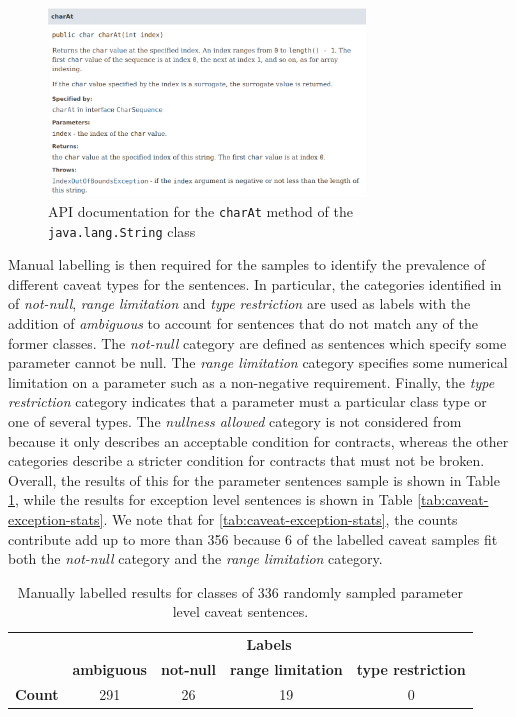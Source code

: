 \begin{figure}
	\label{fig:api-doc-charAt}
	\centering
	\includegraphics[width=0.75\textwidth]{figs/api-doc-charAt.png}
	\caption{API documentation for the \lstinline{charAt} method of the \lstinline{java.lang.String} class}
\end{figure}

Manual labelling is then required for the samples to identify the prevalence of different caveat types for the sentences. In  particular, the categories identified in \cite{zhou-directive} of \textit{not-null}, \textit{range limitation} and \textit{type restriction} are used as labels with the addition of \textit{ambiguous} to account for sentences that do not match any of the former classes. The \textit{not-null} category are defined as sentences which specify some parameter cannot be null. The \textit{range limitation} category specifies some numerical limitation on a parameter such as a non-negative requirement. Finally, the \textit{type restriction} category indicates that a parameter must a particular class type or one of several types. The \textit{nullness allowed} category is not considered from \cite{zhou-directive} because it only describes an acceptable condition for contracts, whereas the other categories describe a stricter condition for contracts that must not be broken. Overall, the results of this for the parameter sentences sample is shown in Table \ref{tab:caveat-param-stats}, while the results for exception level sentences is shown in Table \ref{tab:caveat-exception-stats}. We note that for \ref{tab:caveat-exception-stats}, the counts contribute add up to more than 356 because 6 of the labelled caveat samples fit both the \textit{not-null} category and the \textit{range limitation} category. 

\begin{table}[]
	\begin{tabular}{|l|cccc|}
		\hline
		& \multicolumn{4}{c|}{\textbf{Labels}} \\ \cline{2-5} 
		& \textbf{ambiguous} & \textbf{not-null} & \textbf{range limitation} & \textbf{type restriction} \\ \hline
		\textbf{Count} & 291 & 26 & 19 & 0 \\ \hline
	\end{tabular}
	\caption{Manually labelled results for classes of 336 randomly sampled parameter level caveat sentences.}
	\label{tab:caveat-param-stats}
\end{table}

